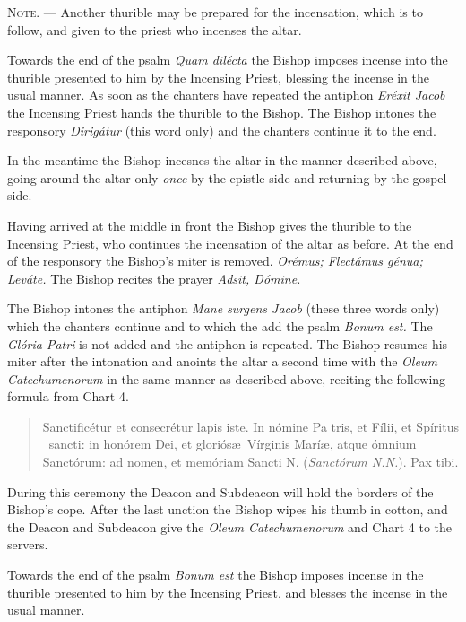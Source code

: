 \documentclass[letterpaper]{report}
\begin{document}
{    \textsc{Note. ---} Another thurible may be prepared for the incensation,
    which is to follow, and given to the priest who incenses the altar.

    \rubric Towards the end of the psalm \textit{Quam dil\'ecta} the Bishop
    imposes incense into the thurible presented to him by the Incensing Priest,
    blessing the incense in the usual manner. As soon as the chanters have
    repeated the antiphon \textit{Er\'exit Jacob} the Incensing Priest hands
    the thurible to the Bishop. The Bishop intones the responsory
    \textit{Dirig\'atur} (this word only) and the chanters continue it to the
    end.

    In the meantime the Bishop incesnes the altar in the manner described
    above, going around the altar only \textit{once} by the epistle side and
    returning by the gospel side.

    \rubric Having arrived at the middle in front the Bishop gives the thurible
    to the Incensing Priest, who continues the incensation of the altar as
    before. At the end of the responsory the Bishop's miter is removed.
    \textit{Orémus; Flectámus génua; Leváte.} The Bishop recites the prayer
    \textit{Adsit, Dómine.}

    \rubric The Bishop intones the antiphon \textit{Mane surgens Jacob} (these
    three words only) which the chanters continue and to which the add the
    psalm \textit{Bonum est.} The \textit{Gl\'oria Patri} is not added and the
    antiphon is repeated. The Bishop resumes his miter after the intonation and
    anoints the altar a second time with the \textit{Oleum Catechumenorum} in
    the same manner as described above, reciting the following formula from
    Chart 4.

    \begin{quote}
        Sancti\cross ficétur et conse\cross crétur lapis iste. In nómine Pa\cross
        tris, et Fí\cross lii, et Spíritus \cross\ sancti: in honórem Dei, et
        gloriós\ae\ Vírginis Marí\ae, atque ómnium Sanctórum: ad nomen, et memóriam
        Sancti N. (\textit{Sanctórum N.N.}). Pax tibi.
    \end{quote}

    During this ceremony the Deacon and Subdeacon will hold the borders of the
    Bishop's cope. After the last unction the Bishop wipes his thumb in cotton, and
    the Deacon and Subdeacon give the \textit{Oleum Catechumenorum} and Chart 4 to
    the servers.

    \rubric Towards the end of the psalm \textit{Bonum est} the Bishop imposes
    incense in the thurible presented to him by the Incensing Priest, and
    blesses the incense in the usual manner.

}
\end{document}
